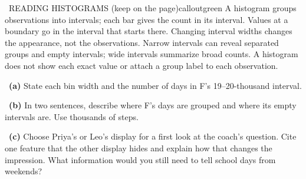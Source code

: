 \documentclass[11pt]{article}
\begin{document}
\begin{callout}{\IconBook\ READING HISTOGRAMS (keep on the page)}{calloutgreen}
A histogram groups observations into intervals; each bar gives the count in its interval. Values at a boundary go in the interval that starts there. Changing interval widths changes the appearance, not the observations. Narrow intervals can reveal separated groups and empty intervals; wide intervals summarize broad counts. A histogram does not show each exact value or attach a group label to each observation.
\end{callout}

~\textbf{(a)} State each bin width and the number of days in F's 19--20-thousand interval.\par
{}

~\textbf{(b)} In two sentences, describe where F's days are grouped and where its empty intervals are. Use thousands of steps.\par
{}

~\textbf{(c)} Choose Priya's or Leo's display for a first look at the coach's question. Cite one feature that the other display hides and explain how that changes the impression. What information would you still need to tell school days from weekends?\par
{}
\end{document}
